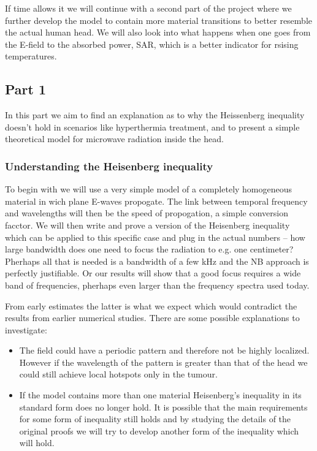 \documentclass[11pt,a4paper, 
english, swedish %
]{article}
\begin{document}
If time allows it we will continue with a second part of the project where we further develop the model to contain more material transitions to better resemble the actual human head. We will also look into what happens when one goes from the E-field to the absorbed power, SAR, which is a better indicator for rsising temperatures.

\subsection{Part 1}
In this part we aim to find an explanation as to why the Heissenberg inequality doesn't hold in scenarios like hyperthermia treatment, and to present a simple theoretical model for microwave radiation inside the head.


\subsubsection{Understanding the Heisenberg inequality}
To begin with we will use a very simple model of a completely homogeneous material in wich plane E-waves propogate. The link between temporal frequency and wavelengths will then be the speed of propogation, a simple conversion facctor.
We will then write and prove a version of the Heisenberg inequality which can be applied to this specific case and plug in the actual numbers -- how large bandwidth does one need to focus the radiation to e.g. one centimeter? 
Pherhaps all that is needed is a bandwidth of a few kHz and the NB approach is perfectly justifiable. Or our results will show that a good focus requires a wide band of frequencies, pherhaps even larger than the frequency spectra used today. 

From early estimates the latter is what we expect which would contradict the results from earlier numerical studies. There are some possible explanations to investigate:
\begin{itemize}
\item 
The field could have a periodic pattern and therefore not be highly localized. However if the wavelength of the pattern is greater than that of the head we could still achieve local hotspots only in the tumour.
\item
If the model contains more than one material Heisenberg's inequality in its standard form does no longer hold. It is possible that the main requirements for some form of inequality still holds and by studying the details of the original proofs we will try to develop another form of the inequality which will hold.
\end{itemize}
\end{document}
